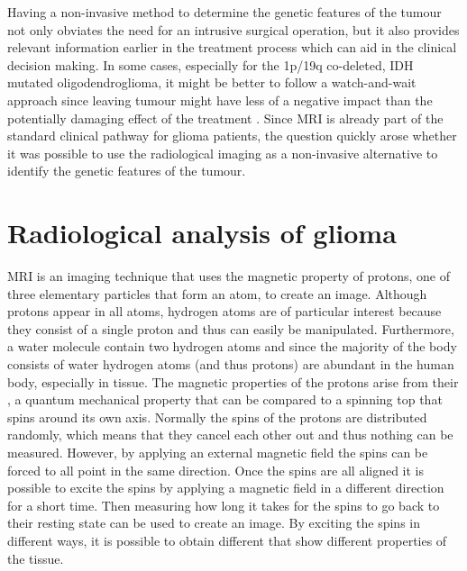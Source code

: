 Having a non-invasive method to determine the genetic features of the tumour not only obviates the need for an intrusive surgical operation, but it also provides relevant information earlier in the treatment process which can aid in the clinical decision making.
In some cases, especially for the 1p/19q co-deleted, IDH mutated oligodendroglioma, it might be better to follow a watch-and-wait approach since leaving tumour might have less of a negative impact than the potentially damaging effect of the treatment \autocite{vandenbent2012lggtreatment, welle2017EANO}.
Since \gls{MRI} is already part of the standard clinical pathway for glioma patients, the question quickly arose whether it was possible to use the radiological imaging as a non-invasive alternative to identify the genetic features of the tumour.

\section{Radiological analysis of glioma}

\gls{MRI} is an imaging technique that uses the magnetic property of protons, one of three elementary particles that form an atom, to create an image.
Although protons appear in all atoms, hydrogen atoms are of particular interest because they consist of a single proton and thus can easily be manipulated.
Furthermore, a water molecule contain two hydrogen atoms and since the majority of the body consists of water hydrogen atoms (and thus protons) are abundant in the human body, especially in tissue.
The magnetic properties of the protons arise from their , a quantum mechanical property that can be compared to a spinning top that spins around its own axis.
Normally the spins of the protons are distributed randomly, which means that they cancel each other out and thus nothing can be measured.
However, by applying an external magnetic field the spins can be forced to all point in the same direction.
Once the spins are all aligned it is possible to excite the spins by applying a magnetic field in a different direction for a short time.
Then measuring how long it takes for the spins to go back to their resting state can be used to create an image.
By exciting the spins in different ways, it is possible to obtain different  that show different properties of the tissue.

